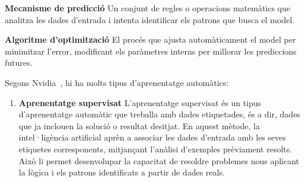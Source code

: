 \begin{enumerate}
\begin{itemize}
            {\color{gray}
            \item \textbf{Mecanisme de predicció}
            \subitem\hspace*{-1\leftmargin} Un conjunt de regles o operacions matemàtics que analitza   les dades d'entrada i intenta identificar els patrons que busca el model.
            \item \textbf{Algoritme d'optimització}
            \subitem\hspace*{-1\leftmargin} El procés que ajusta automàticament el model per minimitzar l'error, modificant els paràmetres interns per millorar les prediccions futures.}
        \end{itemize}

             Segons Nvidia~\cite{Nvidia}, hi ha molts tipus d'aprenentatge automàtics:
            \begin{enumerate}
                \item \textbf{Aprenentatge supervisat}
                 L'aprenentatge supervisat és un tipus d'aprenentatge automàtic que treballa amb dades etiquetades, és a dir, dades que ja inclouen la solució o resultat desitjat. En aquest mètode, la intel·ligència artificial aprèn a associar les dades d'entrada amb les seves etiquetes corresponents, mitjançant l'anàlisi d'exemples prèviament resolts. Això li permet desenvolupar la capacitat de resoldre problemes nous aplicant la lògica i els patrons identificats a partir de dades reals.

\end{enumerate}
\end{enumerate}
